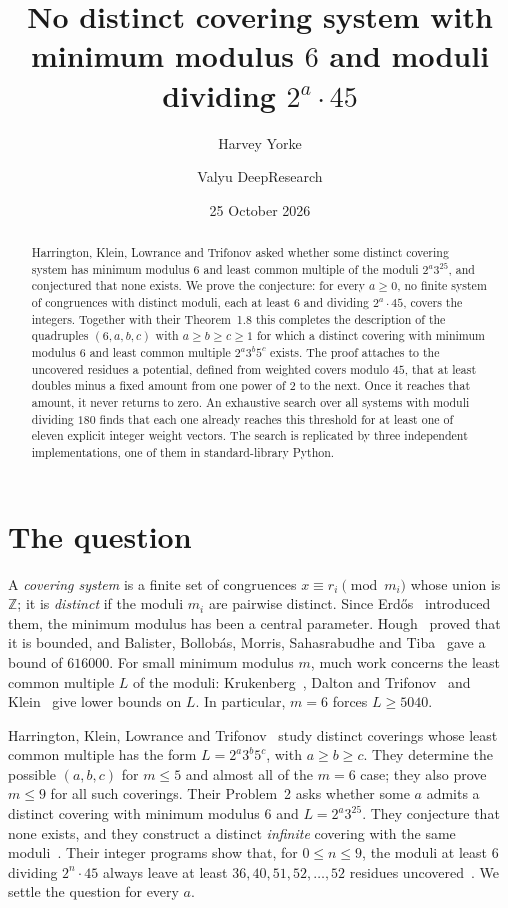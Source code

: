 \documentclass[11pt]{amsart}
\title{No distinct covering system with minimum modulus $6$ and moduli dividing $2^a\cdot 45$}
\author{Harvey Yorke}
\author{Valyu DeepResearch}
\date{25 October 2026}
\theoremstyle{definition}
\theoremstyle{remark}
\newcommand{\Z}{\mathbb Z}
\begin{document}
\raggedbottom
\begin{abstract}
Harrington, Klein, Lowrance and Trifonov asked whether some distinct covering system has minimum modulus $6$ and least common multiple of the moduli $2^a3^25$, and conjectured that none exists. We prove the conjecture: for every $a\ge0$, no finite system of congruences with distinct moduli, each at least $6$ and dividing $2^a\cdot45$, covers the integers. Together with their Theorem~1.8 this completes the description of the quadruples $(6,a,b,c)$ with $a\ge b\ge c\ge1$ for which a distinct covering with minimum modulus $6$ and least common multiple $2^a3^b5^c$ exists. The proof attaches to the uncovered residues a potential, defined from weighted covers modulo $45$, that at least doubles minus a fixed amount from one power of $2$ to the next. Once it reaches that amount, it never returns to zero. An exhaustive search over all systems with moduli dividing $180$ finds that each one already reaches this threshold for at least one of eleven explicit integer weight vectors. The search is replicated by three independent implementations, one of them in standard-library Python.
\end{abstract}
\maketitle

\section{The question}

A \emph{covering system} is a finite set of congruences $x\equiv r_i\pmod{m_i}$ whose union is $\Z$; it is \emph{distinct} if the moduli $m_i$ are pairwise distinct. Since Erd\H{o}s~\cite{Erdos1950} introduced them, the minimum modulus has been a central parameter. Hough~\cite{Hough2015} proved that it is bounded, and Balister, Bollob\'as, Morris, Sahasrabudhe and Tiba~\cite{BBMST2022} gave a bound of $616000$. For small minimum modulus $m$, much work concerns the least common multiple $L$ of the moduli: Krukenberg~\cite{Krukenberg1971}, Dalton and Trifonov~\cite{DaltonTrifonov2022} and Klein~\cite{Klein2025} give lower bounds on $L$. In particular, $m=6$ forces $L\ge5040$.

Harrington, Klein, Lowrance and Trifonov~\cite{HKLT2026} study distinct coverings whose least common multiple has the form $L=2^a3^b5^c$, with $a\ge b\ge c$. They determine the possible $(a,b,c)$ for $m\le 5$ and almost all of the $m=6$ case; they also prove $m\le 9$ for all such coverings. Their Problem~2 asks whether some $a$ admits a distinct covering with minimum modulus $6$ and $L=2^a3^25$. They conjecture that none exists, and they construct a distinct \emph{infinite} covering with the same moduli~\cite[Theorem~1.10]{HKLT2026}. Their integer programs show that, for $0\le n\le 9$, the moduli at least $6$ dividing $2^n\cdot45$ always leave at least $36,40,51,52,\dots,52$ residues uncovered~\cite[Section~6]{HKLT2026}. We settle the question for every $a$.
\end{document}
